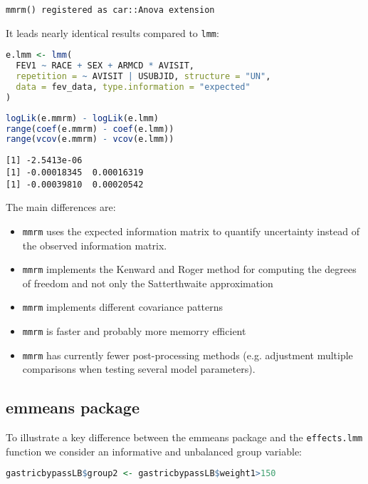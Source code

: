 \documentclass[12pt]{article}
\begin{document}
\label{}
\begin{verbatim}
mmrm() registered as car::Anova extension
\end{verbatim}


It leads nearly identical results compared to \texttt{lmm}:
\begin{lstlisting}[language=r,numbers=none]
e.lmm <- lmm(
  FEV1 ~ RACE + SEX + ARMCD * AVISIT,
  repetition = ~ AVISIT | USUBJID, structure = "UN",
  data = fev_data, type.information = "expected"
)
\end{lstlisting}
\begin{lstlisting}[language=r,numbers=none]
logLik(e.mmrm) - logLik(e.lmm)
range(coef(e.mmrm) - coef(e.lmm))
range(vcov(e.mmrm) - vcov(e.lmm))
\end{lstlisting}

\label{}
\begin{verbatim}
[1] -2.5413e-06
[1] -0.00018345  0.00016319
[1] -0.00039810  0.00020542
\end{verbatim}


The main differences are:
\begin{itemize}
\item \texttt{mmrm} uses the expected information matrix to quantify uncertainty
instead of the observed information matrix.
\item \texttt{mmrm} implements the Kenward and Roger method for computing the degrees of
freedom and not only the Satterthwaite approximation
\item \texttt{mmrm} implements different covariance patterns
\item \texttt{mmrm} is faster and probably more memorry efficient
\item \texttt{mmrm} has currently fewer post-processing methods (e.g. adjustment
multiple comparisons when testing several model parameters).
\end{itemize}

\clearpage
\subsection{emmeans package}
\label{sec:org2b0f27a}

To illustrate a key difference between the emmeans package and the
\texttt{effects.lmm} function we consider an informative and unbalanced group
variable:
\begin{lstlisting}[language=r,numbers=none]
gastricbypassLB$group2 <- gastricbypassLB$weight1>150
\end{lstlisting}
\end{document}
